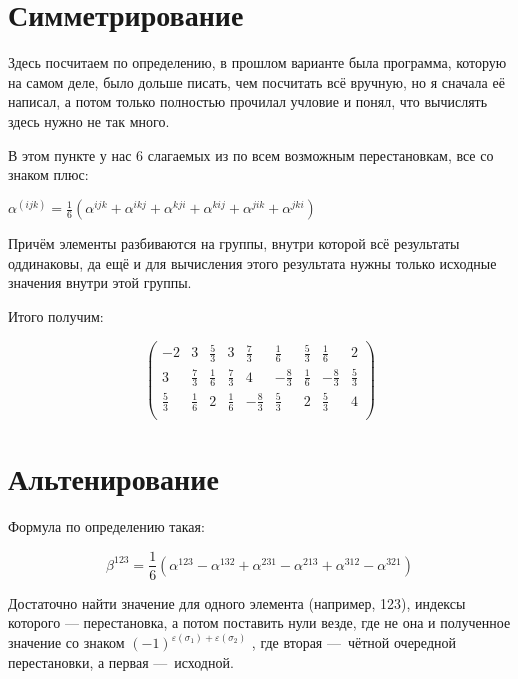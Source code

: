 \documentclass[12pt, a4paper]{article}
\newcommand\arr[2]{\left(\begin{array}{#1}#2\end{array}\right)}
\begin{document}
    \section{Симметрирование}

    Здесь посчитаем по определению, в прошлом варианте была программа, 
    которую на самом деле, было дольше писать, чем посчитать всё вручную, 
    но я сначала её написал, а потом только полностью прочилал учловие 
    и понял, что вычислять здесь нужно не так много. 

    В этом пункте у нас 6 слагаемых из по всем возможным перестановкам, все со знаком плюс:

    $\alpha^{(i j k)}=\frac{1}{6}\left(\alpha^{i j k}+\alpha^{i k j}+\alpha^{k j i}+ \alpha^{k i j}+\alpha^{j i k}+\alpha^{j k i}\right)$
    
    Причём элементы разбиваются на группы, внутри которой всё результаты оддинаковы, 
    да ещё и для вычисления этого результата нужны только исходные значения внутри этой группы.

    Итого получим:

    \begin{equation}
        \arr{ccc|ccc|ccc}{
            -2 & 3 & \frac{5}{3}           & 3 & \frac73 & \frac16              & \frac53 & \frac16 & 2 \\
            3 & \frac{7}{3} & \frac{1}{6}  & \frac73  & 4 & -\frac83            & \frac16 & -\frac83 & \frac53 \\
            \frac{5}{3} & \frac{1}{6} & 2  &  \frac16 & -\frac83 & \frac53      & 2 & \frac53 & 4 \\
        }
    \end{equation}


    \section{Альтенирование}

    Формула по определению такая:

    \begin{equation}
        \beta^{123}=\frac{1}{6}\left(\alpha^{123}-\alpha^{132}+\alpha^{231}-\alpha^{213}+\alpha^{312}-\alpha^{321}\right)
    \end{equation}

    Достаточно найти значение для одного элемента (например, 123), индексы которого — перестановка, 
    а потом поставить нули везде, где не она и полученное значение со знаком $(-1)^{\varepsilon(\sigma_1) + \varepsilon(\sigma_2)}$
    , где вторая — чётной очередной перестановки, а первая — исходной.
\end{document}
